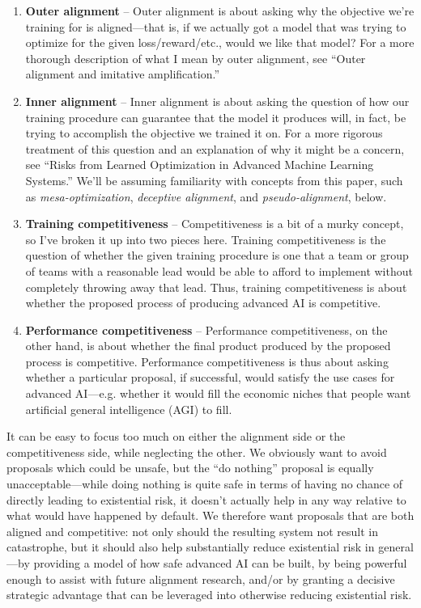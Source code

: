 \documentclass[
  onecolumn,
  natbib,
]{miri-tech-article}
\begin{document}
\begin{enumerate}
\item \textbf{Outer alignment} -- Outer alignment is about asking why the objective we're training for is aligned---that is, if we actually got a model that was trying to optimize for the given loss/reward/etc., would we like that model? For a more thorough description of what I mean by outer alignment, see ``Outer alignment and imitative amplification.''\cite{outer_alignment}
\item \textbf{Inner alignment} -- Inner alignment is about asking the question of how our training procedure can guarantee that the model it produces will, in fact, be trying to accomplish the objective we trained it on. For a more rigorous treatment of this question and an explanation of why it might be a concern, see ``Risks from Learned Optimization in Advanced Machine Learning Systems.''\cite{risks} We'll be assuming familiarity with concepts from this paper, such as \emph{mesa-optimization}, \emph{deceptive alignment}, and \emph{pseudo-alignment}, below.
\item \textbf{Training competitiveness} -- Competitiveness is a bit of a murky concept, so I've broken it up into two pieces here. Training competitiveness is the question of whether the given training procedure is one that a team or group of teams with a reasonable lead would be able to afford to implement without completely throwing away that lead. Thus, training competitiveness is about whether the proposed process of producing advanced AI is competitive.
\item \textbf{Performance competitiveness} -- Performance competitiveness, on the other hand, is about whether the final product produced by the proposed process is competitive. Performance competitiveness is thus about asking whether a particular proposal, if successful, would satisfy the use cases for advanced AI---e.g. whether it would fill the economic niches that people want artificial general intelligence (AGI) to fill.
\end{enumerate}

\noindent It can be easy to focus too much on either the alignment side or the competitiveness side, while neglecting the other. We obviously want to avoid proposals which could be unsafe, but the ``do nothing'' proposal is equally unacceptable---while doing nothing is quite safe in terms of having no chance of directly leading to existential risk, it doesn't actually help in any way relative to what would have happened by default. We therefore want proposals that are both aligned and competitive: not only should the resulting system not result in catastrophe, but it should also help substantially reduce existential risk in general---by providing a model of how safe advanced AI can be built, by being powerful enough to assist with future alignment research, and/or by granting a decisive strategic advantage that can be leveraged into otherwise reducing existential risk.
\end{document}
